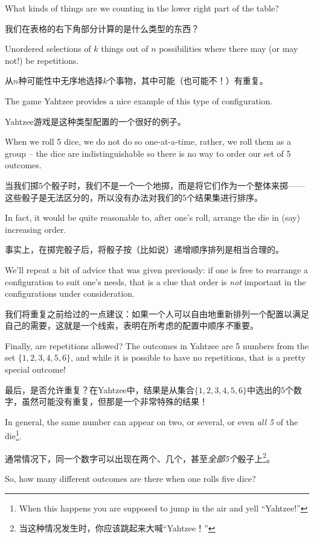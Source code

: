 What kinds of things are we counting in the lower right part of the table?

我们在表格的右下角部分计算的是什么类型的东西？

Unordered selections of $k$ things out of $n$ possibilities where there may
(or may not!) be repetitions.

从$n$种可能性中无序地选择$k$个事物，其中可能（也可能不！）有重复。

The game Yahtzee provides a nice example of
this type of configuration.

Yahtzee游戏是这种类型配置的一个很好的例子。

When we roll 5 dice, we do not do so 
one-at-a-time, rather, we roll them as a group -- the dice are 
indistinguishable so there is no way to order our set of 5 outcomes.

当我们掷5个骰子时，我们不是一个一个地掷，而是将它们作为一个整体来掷——这些骰子是无法区分的，所以没有办法对我们的5个结果集进行排序。

In fact, it would be quite reasonable to, after one's roll, arrange the
die in (say) increasing order.

事实上，在掷完骰子后，将骰子按（比如说）递增顺序排列是相当合理的。

We'll repeat a bit of advice that was given
previously: if one is free to rearrange a configuration to suit one's needs,
that is a clue that order is \emph{not} important in the configurations
under consideration.

我们将重复之前给过的一点建议：如果一个人可以自由地重新排列一个配置以满足自己的需要，这就是一个线索，表明在所考虑的配置中顺序\emph{不}重要。

Finally, are repetitions allowed?  The outcomes
in Yahtzee are 5 numbers from the set $\{1,2,3,4,5,6\}$, and while it
is possible to have no repetitions, that is a pretty special outcome!

最后，是否允许重复？在Yahtzee中，结果是从集合$\{1,2,3,4,5,6\}$中选出的5个数字，虽然可能没有重复，但那是一个非常特殊的结果！

In general, the same number can appear on two, or several, or even 
\emph{all 5} of the die\footnote{When this happens you are supposed 
to jump in the air and yell ``Yahtzee!''}.

通常情况下，同一个数字可以出现在两个、几个，甚至\emph{全部5个}骰子上\footnote{当这种情况发生时，你应该跳起来大喊“Yahtzee！”}。

So, how many different outcomes
are there when one rolls five dice?

